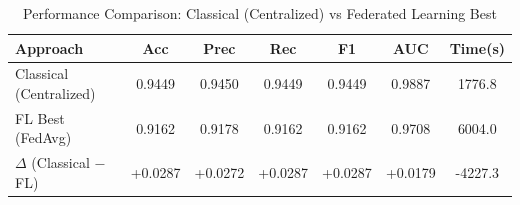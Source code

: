 \begin{table}[t]
\centering
\caption{Performance Comparison: Classical (Centralized) vs Federated Learning Best}
\label{tab:classical_vs_fl}
\begin{tabular}{l c c c c c c}
\hline
Approach & Acc & Prec & Rec & F1 & AUC & Time(s) \\ \hline
Classical (Centralized) & 0.9449 & 0.9450 & 0.9449 & 0.9449 & 0.9887 & 1776.8 \\ 
FL Best (FedAvg) & 0.9162 & 0.9178 & 0.9162 & 0.9162 & 0.9708 & 6004.0 \\ 
\hline
$\Delta$ (Classical $-$ FL) & +0.0287 & +0.0272 & +0.0287 & +0.0287 & +0.0179 & -4227.3 \\ 
\hline
\end{tabular}
\end{table}
